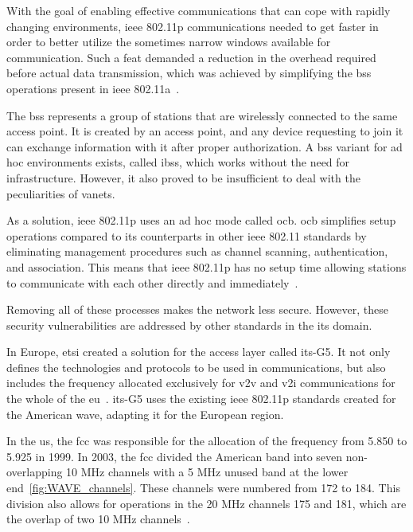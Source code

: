 With the goal of enabling effective communications that can cope with rapidly changing environments, \gls{ieee} 802.11p communications needed to get faster in order to better utilize the sometimes narrow windows available for communication. Such a feat demanded a reduction in the overhead required before actual data transmission, which was achieved by simplifying the \gls{bss} operations present in \gls{ieee} 802.11a~\cite{jiang_ieee_2008}.

The \gls{bss} represents a group of stations that are wirelessly connected to the same access point. It is created by an access point, and any device requesting to join it can exchange information with it after proper authorization. A \gls{bss} variant for ad hoc environments exists, called \gls{ibss}, which works without the need for infrastructure. However, it also proved to be insufficient to deal with the peculiarities of \glspl{vanet}.

As a solution, \gls{ieee} 802.11p uses an ad hoc mode called \gls{ocb}. \gls{ocb} simplifies setup operations compared to its counterparts in other \gls{ieee} 802.11 standards by eliminating management procedures such as channel scanning, authentication, and association. This means that \gls{ieee} 802.11p has no setup time allowing stations to communicate with each other directly and immediately~\cite{festag_cooperative_2014}.

Removing all of these processes makes the network less secure. However, these security vulnerabilities are addressed by other standards in the \gls{its} domain.

In Europe, \gls{etsi} created a solution for the access layer called \gls{its}-G5. It not only defines the technologies and protocols to be used in communications, but also includes the frequency allocated exclusively for \gls{v2v} and \gls{v2i} communications for the whole of the \gls{eu}~\cite{asselin-miller_study_2016}. \gls{its}-G5 uses the existing \gls{ieee} 802.11p standards created for the American \gls{wave}, adapting it for the European region.

In the \gls{us}, the \gls{fcc} was responsible for the allocation of the frequency from 5.850 to 5.925 in 1999. In 2003, the \gls{fcc} divided the American band into seven non-overlapping 10 MHz channels with a 5 MHz unused band at the lower end~\ref{fig:WAVE_channels}. These channels were numbered from 172 to 184. This division also allows for operations in the 20 MHz channels 175 and 181, which are the overlap of two 10 MHz channels~\cite{harri_multi-channel_2015}.

